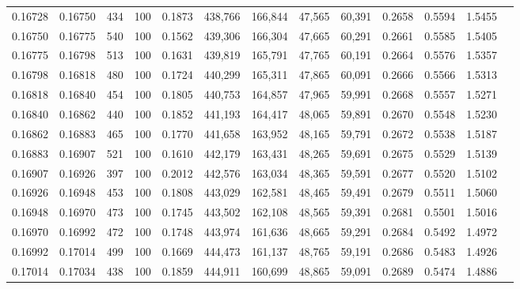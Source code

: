 \begin{tabular}{rrrrrrrrrrrrr}
0.16728 & 0.16750 &   434 & 100 &                                     0.1873 & 438,766 & 166,844 &  47,565 &  60,391 & 0.2658 & 0.5594 & 1.5455 \\
0.16750 & 0.16775 &   540 & 100 &                                     0.1562 & 439,306 & 166,304 &  47,665 &  60,291 & 0.2661 & 0.5585 & 1.5405 \\
0.16775 & 0.16798 &   513 & 100 &                                     0.1631 & 439,819 & 165,791 &  47,765 &  60,191 & 0.2664 & 0.5576 & 1.5357 \\
0.16798 & 0.16818 &   480 & 100 &                                     0.1724 & 440,299 & 165,311 &  47,865 &  60,091 & 0.2666 & 0.5566 & 1.5313 \\
0.16818 & 0.16840 &   454 & 100 &                                     0.1805 & 440,753 & 164,857 &  47,965 &  59,991 & 0.2668 & 0.5557 & 1.5271 \\
0.16840 & 0.16862 &   440 & 100 &                                     0.1852 & 441,193 & 164,417 &  48,065 &  59,891 & 0.2670 & 0.5548 & 1.5230 \\
0.16862 & 0.16883 &   465 & 100 &                                     0.1770 & 441,658 & 163,952 &  48,165 &  59,791 & 0.2672 & 0.5538 & 1.5187 \\
0.16883 & 0.16907 &   521 & 100 &                                     0.1610 & 442,179 & 163,431 &  48,265 &  59,691 & 0.2675 & 0.5529 & 1.5139 \\
0.16907 & 0.16926 &   397 & 100 &                                     0.2012 & 442,576 & 163,034 &  48,365 &  59,591 & 0.2677 & 0.5520 & 1.5102 \\
0.16926 & 0.16948 &   453 & 100 &                                     0.1808 & 443,029 & 162,581 &  48,465 &  59,491 & 0.2679 & 0.5511 & 1.5060 \\
0.16948 & 0.16970 &   473 & 100 &                                     0.1745 & 443,502 & 162,108 &  48,565 &  59,391 & 0.2681 & 0.5501 & 1.5016 \\
0.16970 & 0.16992 &   472 & 100 &                                     0.1748 & 443,974 & 161,636 &  48,665 &  59,291 & 0.2684 & 0.5492 & 1.4972 \\
0.16992 & 0.17014 &   499 & 100 &                                     0.1669 & 444,473 & 161,137 &  48,765 &  59,191 & 0.2686 & 0.5483 & 1.4926 \\
0.17014 & 0.17034 &   438 & 100 &                                     0.1859 & 444,911 & 160,699 &  48,865 &  59,091 & 0.2689 & 0.5474 & 1.4886 \\

\end{tabular}
